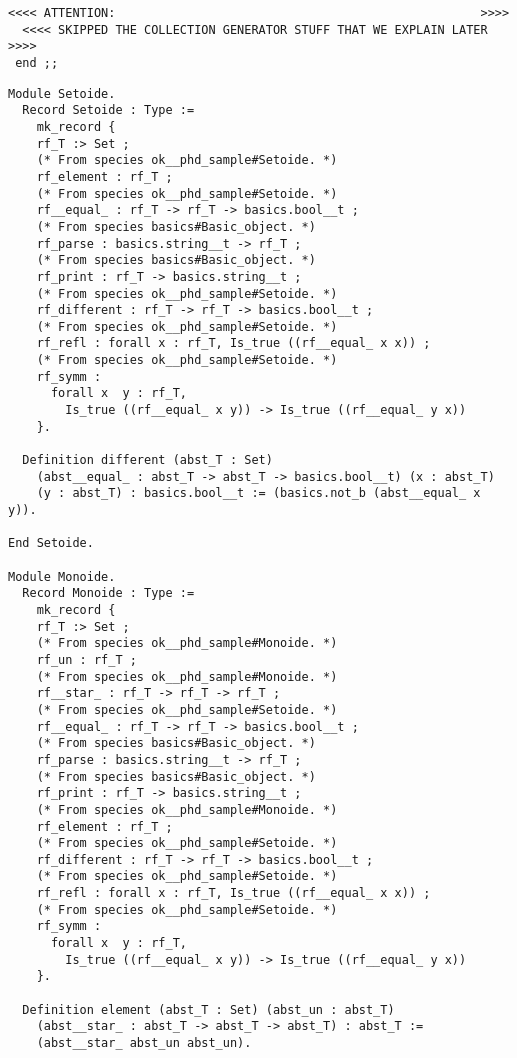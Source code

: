 {\begin{lstlisting}[language=MyOCaml]
  <<<< ATTENTION:                                                   >>>>
  <<<< SKIPPED THE COLLECTION GENERATOR STUFF THAT WE EXPLAIN LATER >>>>
 end ;;
\end{lstlisting}
}


{\footnotesize
\begin{lstlisting}[language=MyCoq]
Module Setoide.
  Record Setoide : Type :=
    mk_record {
    rf_T :> Set ;
    (* From species ok__phd_sample#Setoide. *)
    rf_element : rf_T ;
    (* From species ok__phd_sample#Setoide. *)
    rf__equal_ : rf_T -> rf_T -> basics.bool__t ;
    (* From species basics#Basic_object. *)
    rf_parse : basics.string__t -> rf_T ;
    (* From species basics#Basic_object. *)
    rf_print : rf_T -> basics.string__t ;
    (* From species ok__phd_sample#Setoide. *)
    rf_different : rf_T -> rf_T -> basics.bool__t ;
    (* From species ok__phd_sample#Setoide. *)
    rf_refl : forall x : rf_T, Is_true ((rf__equal_ x x)) ;
    (* From species ok__phd_sample#Setoide. *)
    rf_symm :
      forall x  y : rf_T,
        Is_true ((rf__equal_ x y)) -> Is_true ((rf__equal_ y x))
    }.
  
  Definition different (abst_T : Set)
    (abst__equal_ : abst_T -> abst_T -> basics.bool__t) (x : abst_T)
    (y : abst_T) : basics.bool__t := (basics.not_b (abst__equal_ x y)).
  
End Setoide.

Module Monoide.
  Record Monoide : Type :=
    mk_record {
    rf_T :> Set ;
    (* From species ok__phd_sample#Monoide. *)
    rf_un : rf_T ;
    (* From species ok__phd_sample#Monoide. *)
    rf__star_ : rf_T -> rf_T -> rf_T ;
    (* From species ok__phd_sample#Setoide. *)
    rf__equal_ : rf_T -> rf_T -> basics.bool__t ;
    (* From species basics#Basic_object. *)
    rf_parse : basics.string__t -> rf_T ;
    (* From species basics#Basic_object. *)
    rf_print : rf_T -> basics.string__t ;
    (* From species ok__phd_sample#Monoide. *)
    rf_element : rf_T ;
    (* From species ok__phd_sample#Setoide. *)
    rf_different : rf_T -> rf_T -> basics.bool__t ;
    (* From species ok__phd_sample#Setoide. *)
    rf_refl : forall x : rf_T, Is_true ((rf__equal_ x x)) ;
    (* From species ok__phd_sample#Setoide. *)
    rf_symm :
      forall x  y : rf_T,
        Is_true ((rf__equal_ x y)) -> Is_true ((rf__equal_ y x))
    }.
  
  Definition element (abst_T : Set) (abst_un : abst_T)
    (abst__star_ : abst_T -> abst_T -> abst_T) : abst_T :=
    (abst__star_ abst_un abst_un).
  

\end{lstlisting}}
